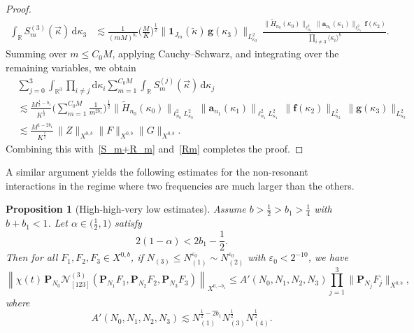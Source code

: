 \documentclass[11pt,reqno,english]{amsart}
\numberwithin{equation}{section}
\theoremstyle{plain}
\newtheorem{proposition}[theorem]{Proposition}
\theoremstyle{definition}
\theoremstyle{remark}
\renewcommand{\epsilon}{\varepsilon}
\newcommand{\la}{\langle}
\newcommand{\ra}{\rangle}
\begin{document}
\begin{proof}
\begin{align*}
		\int_{\mathbb{R}}S_m^{(3)}(\vec{\kappa})\,\mathrm{d}\kappa_3 &\lesssim
		\frac{1}{(mM)^{b_1}}\Big(\frac{M}{K}\Big)^{\frac{1}{2}}\|\mathbf{1}_{J_m}(\widetilde{\kappa})\,\mathbf{g}(\kappa_3)\|_{L_{\kappa_3}^2}\,\frac{\|\widetilde{H}_{n_0}(\kappa_0)\|_{\ell_{n_0}^2}\,\|\mathbf{a}_{n_1}(\kappa_1)\|_{\ell_{n_1}^2}\,\mathbf{f}(\kappa_2)}{\prod_{i\neq 3}\la\kappa_i\ra^b}.
	\end{align*}
	Summing over $m\leq C_0 M$, applying Cauchy--Schwarz, and integrating over the remaining variables, we obtain
	\begin{align*}
		&\sum_{j=0}^{3}\int_{\mathbb{R}^3}\prod_{i\neq j}\mathrm{d}\kappa_i \sum_{m=1}^{C_0 M}\int_{\mathbb{R}}S_m^{(j)}(\vec{\kappa})\, \mathrm{d}\kappa_j\\ &\lesssim \frac{M^{\frac{1}{2}-b_1}}{K^{\frac{1}{2}}}\Big(\sum_{m=1}^{C_0 M}\frac{1}{m^{2b_1}}\Big)^{\frac{1}{2}}\|\widetilde{H}_{n_0}(\kappa_0)\|_{\ell_{n_0}^2 L_{\kappa_0}^2}\,\|\mathbf{a}_{n_1}(\kappa_1)\|_{\ell_{n_1}^2 L_{\kappa_1}^2}\,\|\mathbf{f}(\kappa_2)\|_{L_{\kappa_2}^2}\,\|\mathbf{g}(\kappa_3)\|_{L_{\kappa_3}^2}\\
		&\lesssim
		\frac{M^{1-2b_1}}{K^{\frac{1}{2}}}\,\|Z\|_{X^{0,b}}\|F\|_{X^{0,b}}\|G\|_{X^{0,b}}.
	\end{align*}
	Combining this with~\eqref{S_m+R_m} and~\eqref{Rm} completes the proof.
\end{proof}
	
	
	
	A similar argument yields the following estimates for the non-resonant interactions in the regime where two frequencies are much larger than the others.

\begin{proposition}[High-high-very low estimates]\label{prop:highhighverylow}
	Assume $b>\frac{1}{2}>b_1>\frac{1}{4}$ with $b+b_1<1$. Let $\alpha\in \big(\frac{1}{2},1\big)$ satisfy
	\[
	2(1-\alpha)<2b_1-\frac{1}{2}.
	\]
	Then for all $F_1,F_2,F_3\in X^{0,b}$, if $N_{(3)}\leq N_{(1)}^{\epsilon_0}\sim N_{(2)}^{\epsilon_0}$ with $\epsilon_0<2^{-10}$, we have
	\[
	\left\|
	\chi(t)\,\mathbf{P}_{N_0}\mathcal{N}_{[123]}^{(3)}(\mathbf{P}_{N_1}F_1,\mathbf{P}_{N_2}F_2,\mathbf{P}_{N_3}F_3)
	\right\|_{X^{0,-b_1}}\leq A'(N_0,N_1,N_2,N_3)\prod_{j=1}^3\|\mathbf{P}_{N_j}F_j\|_{X^{0,b}},
	\]
	where
	\[
	A'(N_0,N_1,N_2,N_3)\lesssim N_{(1)}^{\frac{1}{2}-2b_1}N_{(3)}^{\frac{1}{2}}N_{(4)}^{\frac{1}{2}}.
	\]
\end{proposition}
\end{document}
